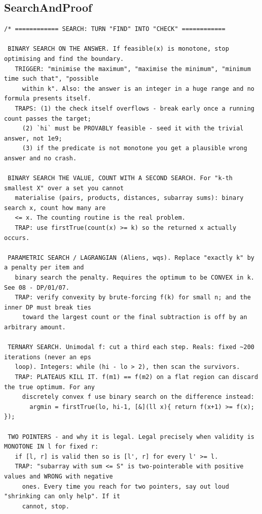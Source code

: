 \documentclass[9pt,a4paper,twocolumn]{extarticle}
\begin{document}
\subsection{SearchAndProof}
\nopagebreak
\begin{lstlisting}
/* ============ SEARCH: TURN "FIND" INTO "CHECK" ============

 BINARY SEARCH ON THE ANSWER. If feasible(x) is monotone, stop optimising and find the boundary.
   TRIGGER: "minimise the maximum", "maximise the minimum", "minimum time such that", "possible
     within k". Also: the answer is an integer in a huge range and no formula presents itself.
   TRAPS: (1) the check itself overflows - break early once a running count passes the target;
     (2) `hi` must be PROVABLY feasible - seed it with the trivial answer, not 1e9;
     (3) if the predicate is not monotone you get a plausible wrong answer and no crash.

 BINARY SEARCH THE VALUE, COUNT WITH A SECOND SEARCH. For "k-th smallest X" over a set you cannot
   materialise (pairs, products, distances, subarray sums): binary search x, count how many are
   <= x. The counting routine is the real problem.
   TRAP: use firstTrue(count(x) >= k) so the returned x actually occurs.

 PARAMETRIC SEARCH / LAGRANGIAN (Aliens, wqs). Replace "exactly k" by a penalty per item and
   binary search the penalty. Requires the optimum to be CONVEX in k. See 08 - DP/01/07.
   TRAP: verify convexity by brute-forcing f(k) for small n; and the inner DP must break ties
     toward the largest count or the final subtraction is off by an arbitrary amount.

 TERNARY SEARCH. Unimodal f: cut a third each step. Reals: fixed ~200 iterations (never an eps
   loop). Integers: while (hi - lo > 2), then scan the survivors.
   TRAP: PLATEAUS KILL IT. f(m1) == f(m2) on a flat region can discard the true optimum. For any
     discretely convex f use binary search on the difference instead:
       argmin = firstTrue(lo, hi-1, [&](ll x){ return f(x+1) >= f(x); });

 TWO POINTERS - and why it is legal. Legal precisely when validity is MONOTONE IN l for fixed r:
   if [l, r] is valid then so is [l', r] for every l' >= l.
   TRAP: "subarray with sum <= S" is two-pointerable with positive values and WRONG with negative
     ones. Every time you reach for two pointers, say out loud "shrinking can only help". If it
     cannot, stop.


\end{lstlisting}
\end{document}
